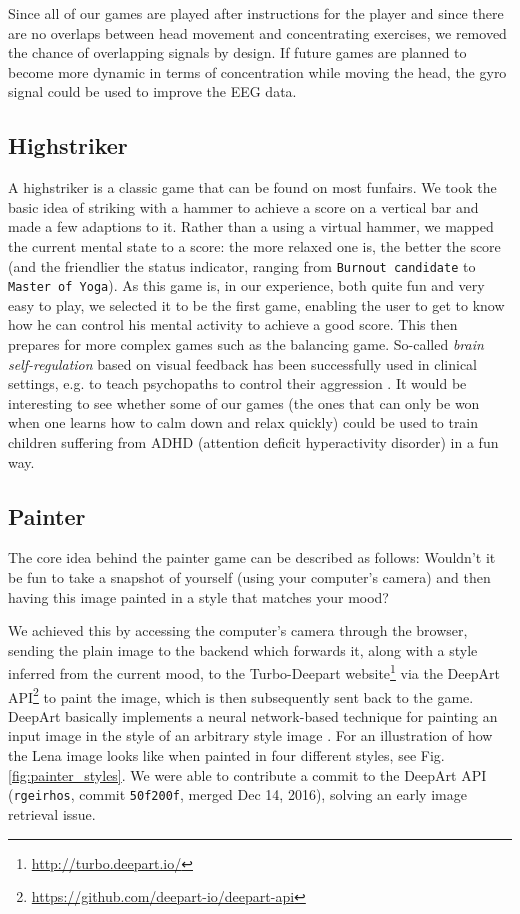 \documentclass{utue} %
\begin{document}
Since all of our games are played after instructions for the player and since there are no overlaps between head movement and concentrating exercises, we removed the chance of overlapping signals by design. If future games are planned to become more dynamic in terms of concentration while moving the head, the gyro signal could be used to improve the EEG data.


\subsection{Highstriker}
A highstriker is a classic game that can be found on most funfairs. We took the basic idea of striking with a hammer to achieve a score on a vertical bar and made a few adaptions to it. Rather than a using a virtual hammer, we mapped the current mental state to a score: the more relaxed one is, the better the score (and the friendlier the status indicator, ranging from \texttt{Burnout candidate} to \texttt{Master of Yoga}). As this game is, in our experience, both quite fun and very easy to play, we selected it to be the first game, enabling the user to get to know how he can control his mental activity to achieve a good score. This then prepares for more complex games such as the balancing game. So-called \textit{brain self-regulation} based on visual feedback has been successfully used in clinical settings, e.g. to teach psychopaths to control their aggression \cite{Konicar2015}. It would be interesting to see whether some of our games (the ones that can only be won when one learns how to calm down and relax quickly) could be used to train children suffering from ADHD (attention deficit hyperactivity disorder) in a fun way.

\subsection{Painter}
The core idea behind the painter game can be described as follows: Wouldn't it be fun to take a snapshot of yourself (using your computer's camera) and then having this image painted in a style that matches your mood? 

We achieved this by accessing the computer's camera through the browser, sending the plain image to the backend which forwards it, along with a style inferred from the current mood, to the Turbo-Deepart website\footnote{\url{http://turbo.deepart.io/}} via the DeepArt API\footnote{\url{https://github.com/deepart-io/deepart-api}} to paint the image, which is then subsequently sent back to the game. DeepArt basically implements a neural network-based technique for painting an input image in the style of an arbitrary style image \cite{Gatys2016}. For an illustration of how the Lena image looks like when painted in four different styles, see Fig. \ref{fig:painter_styles}. We were able to contribute a commit to the DeepArt API (\texttt{rgeirhos}, commit \texttt{50f200f}, merged Dec 14, 2016), solving an early image retrieval issue.
\end{document}
